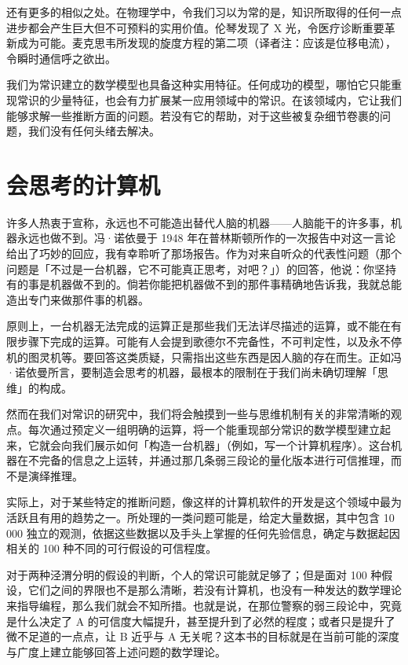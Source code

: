 还有更多的相似之处。在物理学中，令我们习以为常的是，知识所取得的任何一点进步都会产生巨大但不可预料的实用价值。伦琴发现了 X 光，令医疗诊断重要革新成为可能。麦克思韦所发现的旋度方程的第二项（译者注：应该是位移电流），令瞬时通信呼之欲出。

我们为常识建立的数学模型也具备这种实用特征。任何成功的模型，哪怕它只能重现常识的少量特征，也会有力扩展某一应用领域中的常识。在该领域内，它让我们能够求解一些推断方面的问题。若没有它的帮助，对于这些被复杂细节卷裹的问题，我们没有任何头绪去解决。

\section{会思考的计算机}

许多人热衷于宣称，永远也不可能造出替代人脑的机器——人脑能干的许多事，机器永远也做不到。冯·诺依曼于 1948 年在普林斯顿所作的一次报告中对这一言论给出了巧妙的回应，我有幸聆听了那场报告。作为对来自听众的代表性问题（那个问题是「不过是一台机器，它不可能真正思考，对吧？」）的回答，他说：你坚持有的事是机器做不到的。倘若你能把机器做不到的那件事精确地告诉我，我就总能造出专门来做那件事的机器。

原则上，一台机器无法完成的运算正是那些我们无法详尽描述的运算，或不能在有限步骤下完成的运算。可能有人会提到歌德尔不完备性，不可判定性，以及永不停机的图灵机等。要回答这类质疑，只需指出这些东西是因人脑的存在而生。正如冯·诺依曼所言，要制造会思考的机器，最根本的限制在于我们尚未确切理解「思维」的构成。

然而在我们对常识的研究中，我们将会触摸到一些与思维机制有关的非常清晰的观点。每次通过预定义一组明确的运算，将一个能重现部分常识的数学模型建立起来，它就会向我们展示如何「构造一台机器」（例如，写一个计算机程序）。这台机器在不完备的信息之上运转，并通过那几条弱三段论的量化版本进行可信推理，而不是演绎推理。

实际上，对于某些特定的推断问题，像这样的计算机软件的开发是这个领域中最为活跃且有用的趋势之一。所处理的一类问题可能是，给定大量数据，其中包含 10 000 独立的观测，依据这些数据以及手头上掌握的任何先验信息，确定与数据起因相关的 100 种不同的可行假设的可信程度。

对于两种泾渭分明的假设的判断，个人的常识可能就足够了；但是面对 100 种假设，它们之间的界限也不是那么清晰，若没有计算机，也没有一种发达的数学理论来指导编程，那么我们就会不知所措。也就是说，在那位警察的弱三段论中，究竟是什么决定了 A 的可信度大幅提升，甚至提升到了必然的程度；或者只是提升了微不足道的一点点，让 B 近乎与 A 无关呢？这本书的目标就是在当前可能的深度与广度上建立能够回答上述问题的数学理论。

